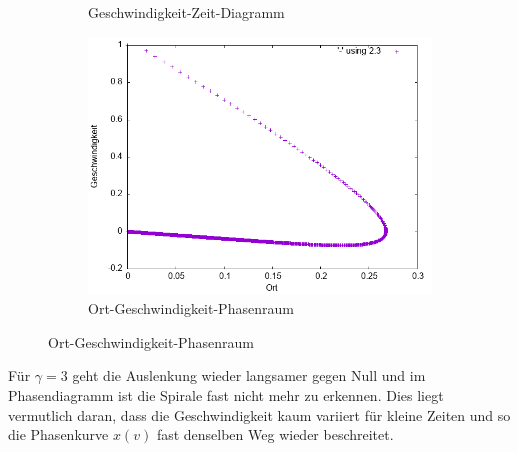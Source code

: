 \documentclass[
    oneside,
    ngerman,
    footinclude=false,
    captions=tableheading,
    DIV=12
]{scrartcl}
\begin{document}
\begin{figure}[H]
\begin{subfigure}[b]{0.45\textwidth}
                        \caption{Geschwindigkeit-Zeit-Diagramm}
                        \label{fig:VVA1(a)-001-3-v}
                    \end{subfigure}
                    \begin{subfigure}[b]{0.45\textwidth}
                        \centering
                        \includegraphics[width=\textwidth]{Bilddateien/VVA1(b)-001-3-xv.png}
                        \caption{Ort-Geschwindigkeit-Phasenraum}
                        \label{fig:VVA1(a)-001-3-xv}
                    \end{subfigure}
                \end{figure}
               Für $\gamma=3$ geht die Auslenkung wieder langsamer gegen Null und im Phasendiagramm ist die Spirale fast nicht mehr zu erkennen. Dies liegt vermutlich daran, dass die Geschwindigkeit kaum variiert für kleine Zeiten und so die Phasenkurve $x(v)$ fast denselben Weg wieder beschreitet.
               \newpage
\end{document}
